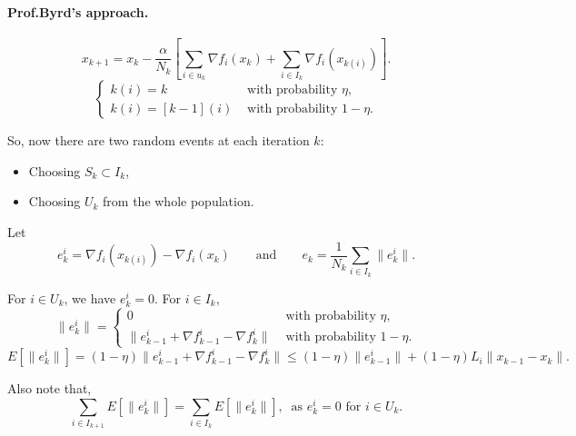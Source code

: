 \documentclass{article}
\begin{document}
 \paragraph{Prof.Byrd's approach.} 
 \[
 x_{k+1} = x_k - \frac{\alpha}{N_k}[\sum_{i\in u_k} \nabla f_i (x_k) + \sum_{i\in I_k} \nabla f_i (x_{k(i)}) ].
 \]
\[
 \begin{cases}
  k(i) = k  & \mbox{ with probability }\eta,\\
  k(i) = [k-1](i) & \mbox{ with probability }1-\eta.
 \end{cases}
\]

\bigskip

So, now there are two random events at each iteration $k$:
\begin{itemize}
 \item Choosing $S_k\subset I_k$,
 \item Choosing $U_k$ from the whole population.
\end{itemize}

Let 
\[
 e_k^i = \nabla f_i(x_{k(i)})-\nabla f_i(x_k) \qquad \mbox{and} \qquad e_k=\frac{1}{N_k}\sum_{i\in I_k} \|e_k^i\|.
\]

For $i\in U_k$, we have $e_k^i=0$.  For $i\in I_k$,
\[
\|e_k^i\| =
 \begin{cases}
  0  & \mbox{ with probability }\eta,\\
  \|e_{k-1}^i + \nabla f_{k-1}^i - \nabla f_k^i\| & \mbox{ with probability }1-\eta.
 \end{cases}
\]
\[
 E[\|e_k^i\|] = (1-\eta)\|e_{k-1}^i + \nabla f_{k-1}^i - \nabla f_k^i\| \leq (1-\eta)\|e_{k-1}^i\| + (1-\eta)L_i \|x_{k-1} - x_k\|.
\]

\bigskip

Also note that,
\[
  \sum_{i\in I_{k+1}} E[\|e_k^i\|] = \sum_{i\in I_k} E[\|e_k^i\|], \ \mbox{ as } e_k^i=0 \mbox{ for } i\in U_k.
\]

\bigskip
\end{document}
